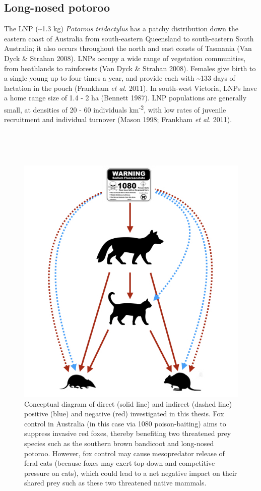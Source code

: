 \documentclass[11pt,a4paper,titlepage,twoside,openright]{style/unimelbthesis}
\begin{document}
\begin{mainmatter}
\hypertarget{long-nosed-potoroo}{%
\subsection{Long-nosed potoroo}\label{long-nosed-potoroo}}

The LNP (\textasciitilde1.3 kg) \emph{Potorous tridactylus} has a patchy distribution down the eastern coast of Australia from south-eastern Queensland to south-eastern South Australia; it also occurs throughout the north and east coasts of Tasmania (Van Dyck \& Strahan 2008). LNPs occupy a wide range of vegetation communities, from heathlands to rainforests (Van Dyck \& Strahan 2008). Females give birth to a single young up to four times a year, and provide each with \textasciitilde133 days of lactation in the pouch (Frankham \emph{et al.} 2011). In south-west Victoria, LNPs have a home range size of 1.4 - 2 ha (Bennett 1987). LNP populations are generally small, at densities of 20 - 60 individuals km\textsuperscript{-2}, with low rates of juvenile recruitment and individual turnover (Mason 1998; Frankham \emph{et al.} 2011).

\newpage

\(~\)

\(~\)
\begin{figure}

{\centering \includegraphics[width=0.7\linewidth]{figure/conceptual_diagram} 

}

\caption{Conceptual diagram of direct (solid line) and indirect (dashed line) positive (blue) and negative (red) investigated in this thesis. Fox control in Australia (in this case via 1080 poison-baiting) aims to suppress invasive red foxes, thereby benefiting two threatened prey species such as the southern brown bandicoot and long-nosed potoroo. However, fox control may cause mesopredator release of feral cats (because foxes may exert top-down and competitive pressure on cats), which could lead to a net negative impact on their shared prey such as these two threatened native mammals.}\label{fig:intro-conceptual}
\end{figure}
\hypertarget{otways17}{%
}
\end{mainmatter}
\end{document}
